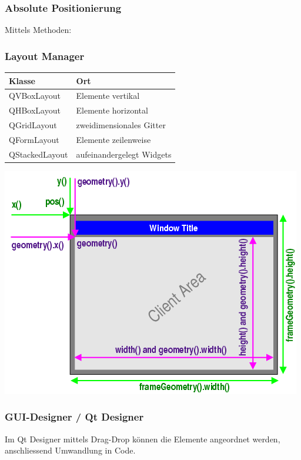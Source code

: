 \subsubsection{Absolute Positionierung}
Mittels Methoden:
\begin{multicols}{2}
    \begin{minipage}{1.08\linewidth}
        
        \subsubsection{Layout Manager} %
        \begin{tabular}{|l|l|}
            \hline \textbf{Klasse} & \textbf{Ort}\\
            \hline QVBoxLayout & Elemente vertikal\\
            \hline QHBoxLayout & Elemente horizontal\\
            \hline QGridLayout & zweidimensionales Gitter\\
            \hline QFormLayout & Elemente zeilenweise\\
            \hline QStackedLayout & aufeinandergelegt Widgets\\
            \hline
        \end{tabular}
       \end{minipage}	
		
	\includegraphics[width=0.8\linewidth]{images/geometry.png}
\end{multicols}
	
\subsubsection{GUI-Designer / Qt Designer}	
	Im Qt Designer mittels Drag-Drop können die Elemente angeordnet werden, anschliessend Umwandlung in Code. 	


